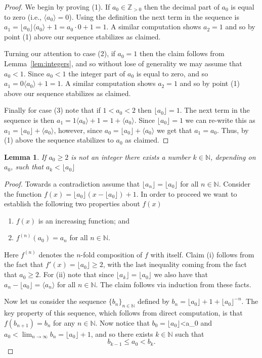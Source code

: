 \documentclass[10pt,reqno]{amsart}
\newtheorem{lemma}{Lemma}[section]
\theoremstyle{remark}
\newcommand{\floor}[1]{\lfloor #1 \rfloor}
\newcommand{\ideal}[1]{\langle #1 \rangle}
\newcommand{\N}{\mathbb{N}}
\newcommand{\Z}{\mathbb{Z}}
\begin{document}
\begin{proof}
We begin by proving (1). If $a_{0}\in \Z_{>0}$ then the decimal part of $a_{0}$ is equal to zero (i.e., $\ideal{a_{0}}=0$). Using the definition the next term in the sequence is $a_{1}=\floor{a_{0}}\ideal{a_{0}}+1=a_{0}\cdot 0 + 1 = 1$. A similar computation shows $a_{2}=1$ and so by point (1) above our sequence stabilizes as claimed. 

Turning our attention to case (2), if $a_{0}=1$ then the claim follows from Lemma~\ref{lem:integers}, and so without lose of generality we may assume that $a_{0}<1$. Since $a_{0}<1$ the integer part of $a_{0}$ is equal to zero, and so $a_{1}=0\ideal{a_{0}}+1=1$. A similar computation shows $a_{2}=1$ and so by point (1) above our sequence stabilizes as claimed. 

Finally for case (3) note that if $1<a_{0}<2$ then $\floor{a_{0}}=1$. The next term in the sequence is then $a_{1}=1\ideal{a_{0}}+1=1+\ideal{a_{0}}$. Since $\floor{a_{0}}=1$ we can re-write this as $a_{1}=\floor{a_{0}}+\ideal{a_{0}}$, however, since $a_{0}=\floor{a_{0}}+\ideal{a_{0}}$ we get that $a_{1}=a_{0}$. Thus, by (1) above the sequence stabilizes to $a_{0}$ as claimed. 
\end{proof}


\begin{lemma}
If $a_{0}\geq2$ is not an integer there exists a number $k\in \N$, depending on $a_{0}$, such that $a_{k} < \floor{a_{0}}$
\end{lemma}

\begin{proof}
Towards a contradiction assume that $\floor{a_{n}}=\floor{a_{0}}$ for all $n\in \N$. Consider the function $f(x)=\floor{a_{0}}\left(x-\floor{a_{0}}\right)+1$. In order to proceed we want to establish the following two properties about $f(x)$
\begin{enumerate}
\item $f(x)$ is an increasing function; and
\item $f^{(n)}(a_{0})=a_{n}$ for all $n\in \N$. 
\end{enumerate}
Here $f^{(n)}$ denotes the $n$-fold composition of $f$ with itself. Claim (i) follows from the fact that $f'(x)=\floor{a_{0}}\geq2$, with the last inequality coming from the fact that $a_{0}\geq2$. For (ii) note that since $\floor{a_{k}}=\floor{a_{0}}$ we also have that $a_{n}-\floor{a_{0}}=\ideal{a_{n}}$ for all $n\in \N$. The claim follows via induction from these facts. 

Now let us consider the sequence $\{b_{n}\}_{n\in \N}$ defined by $b_{n}=\floor{a_{0}}+1+\floor{a_{0}}^{-n}$. The key property of this sequence, which follows from direct computation, is that $f(b_{n+1})=b_{n}$ for any $n\in \N$. Now notice that $b_{0}=\floor{a_{0}}$<a_{0} and $a_{0}< \lim_{n\to \infty}b_{n}= \floor{a_{0}}+1$, and so there exists $k\in \N$ such that 
\[
b_{k-1} \leq a_{0} < b_{k}.
\]
\end{proof}
\end{document}
